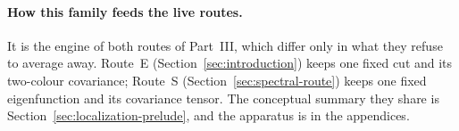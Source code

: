 \documentclass[../../main.tex]{subfiles}
\begin{document}
\paragraph{How this family feeds the live routes.}
It is the engine of both routes of Part~III, which differ only in what they refuse to average
away. Route~E (Section~\ref{sec:introduction}) keeps one fixed cut and its two-colour covariance;
Route~S (Section~\ref{sec:spectral-route}) keeps one fixed eigenfunction and its covariance
tensor. The conceptual summary they share is Section~\ref{sec:localization-prelude}, and the
apparatus is in the appendices.
\end{document}

